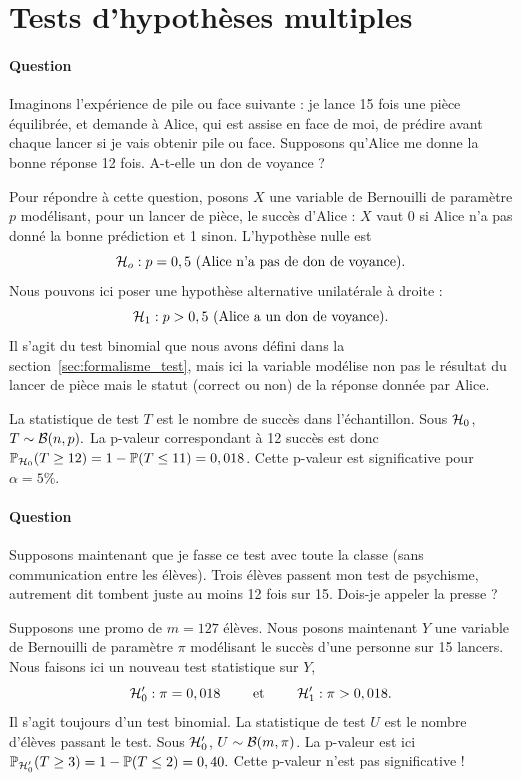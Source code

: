\section{Tests d'hypothèses multiples}
\label{sec:mht}
\paragraph{Question} Imaginons l'expérience de pile ou face suivante : je lance
15 fois une pièce équilibrée, et demande à Alice, qui est assise en face de
moi, de prédire avant chaque lancer si je vais obtenir pile ou face. Supposons
qu'Alice me donne la bonne réponse 12 fois. A-t-elle un don de
voyance ?
\bigskip

\begin{answer}
	Pour répondre à cette question, posons $X$ une variable de Bernouilli de
	paramètre $p$ modélisant, pour un lancer de pièce, le succès d'Alice :
	$X$ vaut 0 si Alice n'a pas donné la bonne prédiction et 1
	sinon. L'hypothèse nulle est
	\[
	\mathcal{H}_o : p = 0,5 \text{ (Alice n'a pas de don de voyance)}.
	\]
	Nous pouvons ici poser une hypothèse alternative unilatérale à droite :
	\[
	\mathcal{H}_1 : p > 0,5 \text{ (Alice a un don de voyance)}.
	\]
	Il s'agit du test binomial que nous avons défini dans la
	section~\ref{sec:formalisme_test}, mais ici la variable modélise non pas le
	résultat du lancer de pièce mais le statut (correct ou non) de la réponse
	donnée par Alice.
	
	La statistique de test $T$ est le nombre de succès dans l'échantillon. Sous
	$\mathcal{H}_0$, $T \sim \mathcal{B}(n, p).$ La p-valeur correspondant à 12 succès est donc
	$\mathbb{P}_{\mathcal{H}_0}(T \geq 12) = 1 - \mathbb{P}(T \leq 11) = 0,018$. Cette p-valeur est
	significative pour $\alpha = 5\%$.
\end{answer}

\paragraph{Question} Supposons maintenant que je fasse ce test avec toute la
classe (sans communication entre les élèves). Trois élèves passent mon test de
psychisme, autrement dit tombent juste au moins 12 fois sur 15. Dois-je appeler
la presse ?
\bigskip

\begin{answer}
	Supposons une promo de $m=127$ élèves. Nous posons maintenant $Y$ une
	variable de Bernouilli de paramètre $\pi$ modélisant le succès d'une personne
	sur 15 lancers. Nous faisons ici un nouveau test statistique sur $Y$,
	\[
	\mathcal{H}_0^\prime : \pi = 0,018 \text { \qquad et \qquad} \mathcal{H}_1^\prime : \pi >
	0,018.
	\]
	Il s'agit toujours d'un test binomial. La statistique de test $U$ est le
	nombre d'élèves passant le test. Sous $\mathcal{H}_0^\prime$, $U \sim \mathcal{B}(m,
	\pi)$.
	La p-valeur est ici
	$\mathbb{P}_{\mathcal{H}_0^\prime}(T \geq 3) = 1 - \mathbb{P}(T \leq 2) = 0,40.$ Cette p-valeur
	n'est pas significative !
\end{answer}

